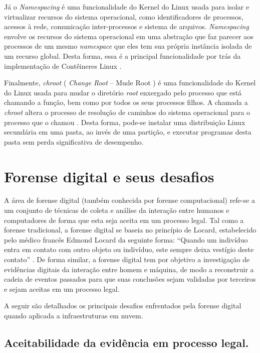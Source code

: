 Já o \textit{Namespacing} é uma funcionalidade do Kernel do Linux usada para isolar e virtualizar recursos do sistema operacional, como identificadores de processos, acessos à rede, comunicação inter-processos e sistema de arquivos.
%
\textit{Namespacing} envolve os recursos do sistema operacional em uma abstração que faz parecer aos processos de um mesmo \textit{namespace} que eles tem sua própria instância isolada de um recurso global.
%
Desta forma, essa é a principal funcionalidade por trás da implementação de Contêineres Linux \cite{UnixManPagesNamespacing}.


Finalmente, \textit{chroot} ( \textit{Change Root} -- Mude Root ) é uma funcionalidade do Kernel do Linux usada para mudar o diretório \textit{root} enxergado pelo processo que está chamando a função, bem como por todos os seus processos filhos. 
%
A chamada a \textit{chroot} altera o processo de resolução de caminhos do sistema operacional para o processo que o chamou \cite{UnixManPagesChRoot}.
%
Desta forma, pode-se instalar uma distribuição Linux secundária em uma pasta, ao invés de uma partição, e executar programas desta pasta sem perda significativa de desempenho.


\section{Forense digital e seus desafios}
\label{sec:forensedigital}


A área de forense digital (também conhecida por forense computacional) refe-se a um conjunto de técnicas de coleta e análise da interação entre humanos e computadores de forma que esta seja aceita em um processo legal.
%
Tal como a forense tradicional, a forense digital se baseia no princípio de Locard, estabelecido pelo médico francês Edmond Locard da seguinte forma: ``Quando um indivíduo entra em contato com outro objeto ou indivíduo, este sempre deixa vestígio deste contato'' \cite{Ramos:2011}.
%
De forma similar, a forense digital tem por objetivo a investigação de evidências digitais da interação entre homem e máquina, de modo a reconstruir a cadeia de eventos passados para que suas conclusões sejam validadas por terceiros e sejam aceitas em um processo legal.
 

A seguir são detalhados os principais desafios enfrentados pela forense digital quando aplicada a infraestruturas em nuvem.

\subsection{Aceitabilidade da evidência em processo legal.}
\label{sec:credibilidadeaceitabilidadeevidencia}

